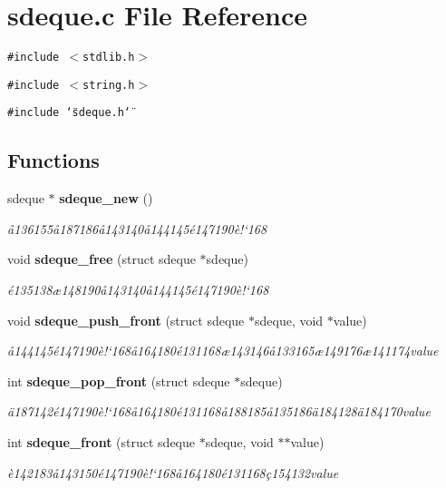 \section{sdeque.c File Reference}
\label{sdeque_8c}
{\tt \#include $<$stdlib.h$>$}\par
{\tt \#include $<$string.h$>$}\par
{\tt \#include \char`\"{}sdeque.h\char`\"{}}\par
\subsection*{Functions}
\begin{CompactItemize}
\item 
sdeque $\ast$ {\bf sdeque\_\-new} ()
\begin{CompactList}\small\item\em \aa{}136155\aa{}187186\aa{}143140\aa{}144145\'{e}147190\`{e}!`168 \item\end{CompactList}\item 
void {\bf sdeque\_\-free} (struct sdeque $\ast$sdeque)
\begin{CompactList}\small\item\em \'{e}135138\ae{}148190\aa{}143140\aa{}144145\'{e}147190\`{e}!`168 \item\end{CompactList}\item 
void {\bf sdeque\_\-push\_\-front} (struct sdeque $\ast$sdeque, void $\ast$value)
\begin{CompactList}\small\item\em \aa{}144145\'{e}147190\`{e}!`168\aa{}164180\'{e}131168\ae{}143146\aa{}133165\ae{}149176\ae{}141174value \item\end{CompactList}\item 
int {\bf sdeque\_\-pop\_\-front} (struct sdeque $\ast$sdeque)
\begin{CompactList}\small\item\em \"{a}187142\'{e}147190\`{e}!`168\aa{}164180\'{e}131168\aa{}188185\aa{}135186\"{a}184128\"{a}184170value \item\end{CompactList}\item 
int {\bf sdeque\_\-front} (struct sdeque $\ast$sdeque, void $\ast$$\ast$value)
\begin{CompactList}\small\item\em \`{e}142183\aa{}143150\'{e}147190\`{e}!`168\aa{}164180\'{e}131168\c{c}154132value \item\end{CompactList}\item 
$$
\end{CompactItemize}
